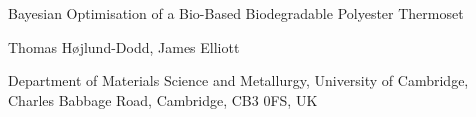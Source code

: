 \begin{flushleft}
    \LARGE{Bayesian Optimisation of a Bio-Based Biodegradable Polyester Thermoset}


    \vspace{0.25cm}
    \large{Thomas H{\o}jlund-Dodd, James Elliott}
    
    \vspace{0.25cm}
    \footnotesize{Department of Materials Science and Metallurgy, University of Cambridge, Charles Babbage Road, Cambridge, CB3 0FS, UK}
\end{flushleft}